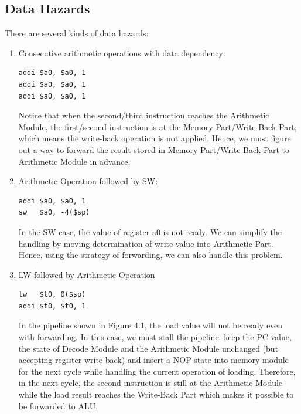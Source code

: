\documentclass[a4paper,12pt, oneside]{book}
\begin{document}
\subsection{Data Hazards}
There are several kinds of data hazards:
\begin{enumerate}
\item Consecutive arithmetic operations with data dependency:
\begin{verbatim}
addi $a0, $a0, 1
addi $a0, $a0, 1
addi $a0, $a0, 1
\end{verbatim}
Notice that when the second/third instruction reaches the Arithmetic Module, the first/second instruction is at the Memory Part/Write-Back Part; which means the write-back operation is not applied. Hence, we must figure out a way to forward the result stored in Memory Part/Write-Back Part to Arithmetic Module in advance.
\item Arithmetic Operation followed by SW:
\begin{verbatim}
addi $a0, $a0, 1
sw   $a0, -4($sp)
\end{verbatim}
In the SW case, the value of register a0 is not ready. We can simplify the handling by moving determination of write value into Arithmetic Part. Hence, using the strategy of forwarding, we can also handle this problem.

\item LW followed by Arithmetic Operation
\begin{verbatim}
lw   $t0, 0($sp)
addi $t0, $t0, 1
\end{verbatim}
In the pipeline shown in Figure 4.1, the load value will not be ready even with forwarding. In this case, we must stall the pipeline: keep the PC value, the state of Decode Module and the Arithmetic Module unchanged (but accepting register write-back) and insert a NOP state into memory module for the next cycle while handling the current operation of loading. Therefore, in the next cycle, the second instruction is still at the Arithmetic Module while the load result reaches the Write-Back Part which makes it possible to be forwarded to ALU. 
\end{enumerate}
\end{document}
